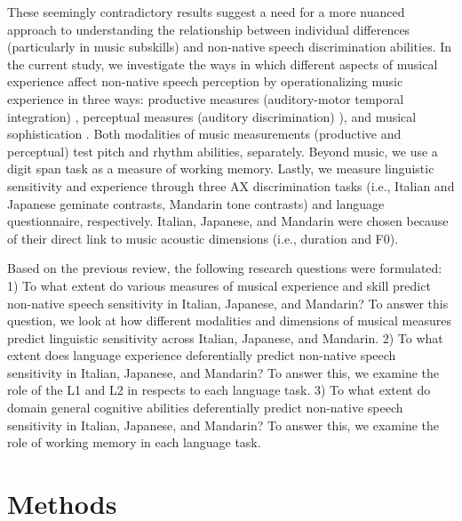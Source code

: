 \documentclass[a4paper]{article}
\begin{document}
These seemingly contradictory results suggest a need for a more nuanced approach to understanding the relationship between individual differences (particularly in music subskills) and non-native speech discrimination abilities. In the current study, we investigate the ways in which different aspects of musical experience affect non-native speech perception by operationalizing music experience in three ways: productive measures (auditory-motor temporal integration) \cite{Kachlicka_Saito_Tierney_2019}, perceptual measures (auditory discrimination) \cite[MET]{Wallentin_Nielsen_Friis-Olivarius_Vuust_Vuust_2010}), and musical sophistication \cite[Goldsmiths-MSI]{Müllensiefen_Gingras_Musil_Stewart_2014}. Both modalities of music measurements (productive and perceptual) test pitch and rhythm abilities, separately. Beyond music, we use a digit span task as a measure of working memory. Lastly, we measure linguistic sensitivity and experience through three AX discrimination tasks (i.e., Italian and Japanese geminate contrasts, Mandarin tone contrasts) and language questionnaire, respectively. Italian, Japanese, and Mandarin were chosen because of their direct link to music acoustic dimensions (i.e., duration and F0).

Based on the previous review, the following research questions were formulated: 1) To what extent do various measures of musical experience and skill predict non-native speech sensitivity in Italian, Japanese, and Mandarin? To answer this question, we look at how different modalities and dimensions of musical measures predict linguistic sensitivity across Italian, Japanese, and Mandarin. 2) To what extent does language experience deferentially predict non-native speech sensitivity in Italian, Japanese, and Mandarin? To answer this, we examine the role of the L1 and L2 in respects to each language task. 3) To what extent do domain general cognitive abilities deferentially predict non-native speech sensitivity in Italian, Japanese, and Mandarin? To answer this, we examine the role of working memory in each language task.

\section{Methods}
\end{document}
